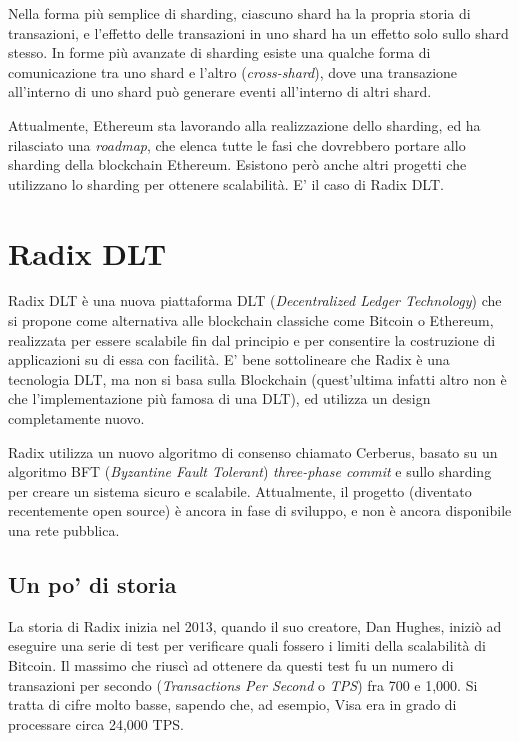 Nella forma più semplice di sharding, ciascuno shard ha la propria storia di transazioni, e l'effetto delle transazioni in uno shard ha un effetto solo sullo shard stesso. In forme più avanzate di sharding esiste una qualche forma di comunicazione tra uno shard e l'altro (\textit{cross-shard}), dove una transazione all'interno di uno shard può generare eventi all'interno di altri shard.

Attualmente, Ethereum sta lavorando alla realizzazione dello sharding, ed ha rilasciato una \textit{roadmap}, che elenca tutte le fasi che dovrebbero portare allo sharding della blockchain Ethereum. Esistono però anche altri progetti che utilizzano lo sharding per ottenere scalabilità. E' il caso di Radix DLT.

\section{Radix DLT}

Radix DLT è una nuova piattaforma DLT (\textit{Decentralized Ledger Technology}) che si propone come alternativa alle blockchain classiche come Bitcoin o Ethereum, realizzata per essere scalabile fin dal principio e per consentire la costruzione di applicazioni su di essa con facilità. E' bene sottolineare che Radix è una tecnologia DLT, ma non si basa sulla Blockchain (quest'ultima infatti altro non è che l'implementazione più famosa di una DLT), ed utilizza un design completamente nuovo.

Radix utilizza un nuovo algoritmo di consenso chiamato Cerberus, basato su un algoritmo BFT (\textit{Byzantine Fault Tolerant}) \textit{three-phase commit} e sullo sharding per creare un sistema sicuro e scalabile. Attualmente, il progetto (diventato recentemente open source) è ancora in fase di sviluppo, e non è ancora disponibile una rete pubblica.

\subsection{Un po' di storia}

La storia di Radix inizia nel 2013, quando il suo creatore, Dan Hughes, iniziò ad eseguire una serie di test per verificare quali fossero i limiti della scalabilità di Bitcoin. Il massimo che riuscì ad ottenere da questi test fu un numero di transazioni per secondo (\textit{Transactions Per Second} o \textit{TPS}) fra 700 e 1,000. Si tratta di cifre molto basse, sapendo che, ad esempio, Visa era in grado di processare circa 24,000 TPS. 

